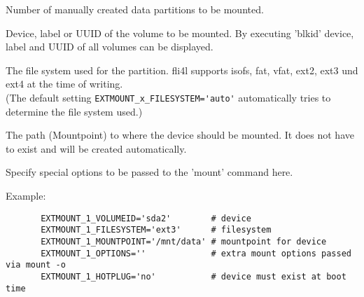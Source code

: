 \begin{description}

    Number of manually created data partitions to be mounted.


    Device, label or UUID of the volume to be mounted. By executing
    'blkid' device, label and UUID of all volumes can be displayed.


    The file system used for the partition. fli4l supports isofs, fat, 
    vfat, ext2, ext3 und ext4 at the time of writing.\\
    (The default setting \verb*?EXTMOUNT_x_FILESYSTEM='auto'? automatically tries to determine 
    the file system used.)


    The path (Mountpoint) to where the device should be mounted. It does not 
    have to exist and will be created automatically.


    Specify special options to be passed to the 'mount' command here.



\end{description}

Example:
\begin{example}
\begin{verbatim}
       EXTMOUNT_1_VOLUMEID='sda2'        # device
       EXTMOUNT_1_FILESYSTEM='ext3'      # filesystem
       EXTMOUNT_1_MOUNTPOINT='/mnt/data' # mountpoint for device
       EXTMOUNT_1_OPTIONS=''             # extra mount options passed via mount -o
       EXTMOUNT_1_HOTPLUG='no'           # device must exist at boot time
\end{verbatim}
\end{example}


